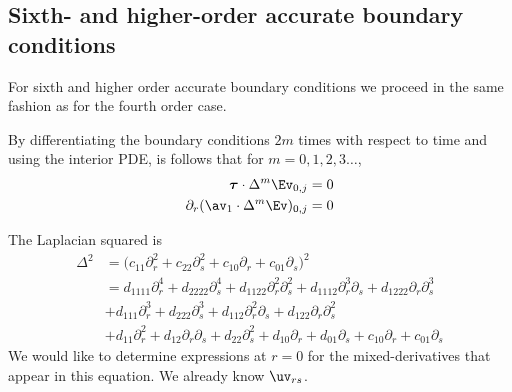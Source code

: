 \documentclass[10pt]{article}
\begin{document}
% 
% 
% 



\subsection{Sixth- and higher-order accurate boundary conditions}

For sixth and higher order accurate boundary conditions we proceed in the same fashion
as for the fourth order case. 

By differentiating the boundary conditions $2m$ times with respect to time and using the 
interior PDE, 
is follows that for $m=0,1,2,3\ldots$,
\begin{align*}
  \tauv\cdot\Delta^m \Ev_{0,j}  &=0  \\
  \partial_r(\av_1\cdot \Delta^m\Ev )_{0,j} &= 0
\end{align*}


The Laplacian squared is
\begin{align*}
   \Delta^2  &= \Big(c_{11} \partial_r^2 + c_{22}\partial_s^2  + c_{10} \partial_r + c_{01} \partial_s \Big)^2 \\
          &= d_{1111}\partial_r^4 + d_{2222}\partial_s^4
             + d_{1122} \partial_r^2\partial_s^2
             + d_{1112} \partial_r^3\partial_s + d_{1222} \partial_r\partial_s^3 \\
        &   + d_{111}\partial_r^3 + d_{222}\partial_s^3
             + d_{112} \partial_r^2\partial_s + d_{122} \partial_r\partial_s^2 \\
    &  +d_{11} \partial_r^2 +d_{12} \partial_r\partial_s + d_{22}\partial_s^2  + d_{10} \partial_r + d_{01} \partial_s 
 + c_{10} \partial_r + c_{01} \partial_s 
\end{align*}
We would like to determine expressions at $r=0$ for the mixed-derivatives that appear in this equation.
We already know $\uv_{rs}$.
\end{document}
